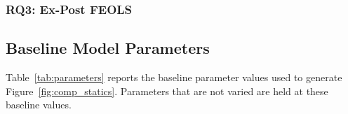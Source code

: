 \documentclass[12pt]{article}
\begin{document}
\clearpage

\subsubsection{RQ3: Ex-Post FEOLS}

\footnotesize

\label{tab:rob_rq3_feols_expost}
\normalsize

\clearpage


\subsection{Baseline Model Parameters} \label{app:parameters}

Table~\ref{tab:parameters} reports the baseline parameter values used to generate Figure~\ref{fig:comp_statics}. Parameters that are not varied are held at these baseline values.

\makeatletter
\renewenvironment{table}[1][H]{\@float{table}[H]}{\end@float}
\makeatother

\renewenvironment{table}[1][]{}{}

\clearpage

\end{document}

